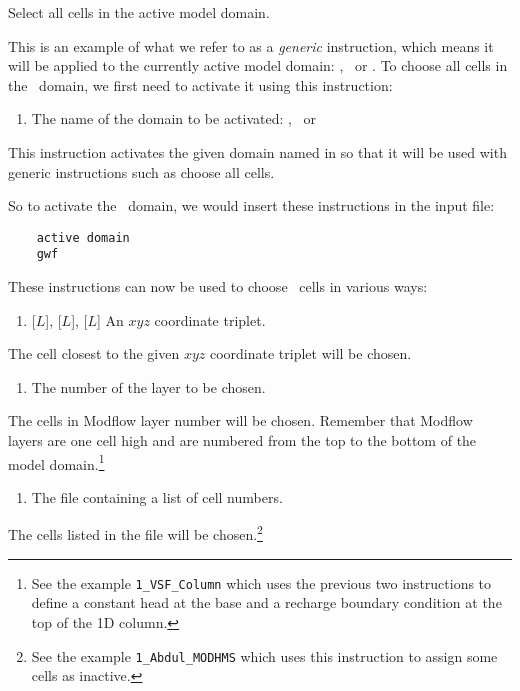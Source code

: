 {
    {Select all cells in the active model domain.
     }

  This is an example of what we refer to as a {\em generic} instruction, which means it will be applied to the currently active model domain: \gwf, \swf\ or \cln.  To choose all cells in the \gwf\ domain, we first need to activate it using this instruction:

    {
        \squish
        \begin{enumerate}
        \item {}  The name of the domain to be activated: \gwf, \swf\ or \cln\
        \end{enumerate}
        This instruction activates the given domain named in   so that it will be used with generic instructions such as \textsf{choose all cells}.
    }

So to activate the \gwf\ domain, we would insert these instructions in the input file:
\begin{verbatim}
    active domain
    gwf
\end{verbatim}

These instructions can now be used to choose \gwf\ cells in various ways\label{page:cellSelect}:

    {
        \squish
        \begin{enumerate}
        \item {} [$L$],  [$L$],  [$L$]  An $xyz$ coordinate triplet.
        \end{enumerate}
        The cell closest to the given $xyz$ coordinate triplet will be chosen.
    }

    {
        \squish
        \begin{enumerate}
        \item {}  The number of the layer to be chosen.
        \end{enumerate}
        The cells in Modflow layer number  will be chosen.  Remember that Modflow layers are one cell high and are numbered from the top to the bottom of the model domain.\footnote{ See the example \texttt{1\_VSF\_Column} which uses the previous two instructions to define a constant head at  the base  and a recharge boundary condition at the top of the 1D column.}
    }

    {
        \squish
        \begin{enumerate}
        \item {}  The file  containing a list of cell numbers.
        \end{enumerate}
        The cells listed in the file  will be chosen.\footnote{ See the example \texttt{1\_Abdul\_MODHMS} which uses this instruction to assign some cells as inactive.}
    }

}
